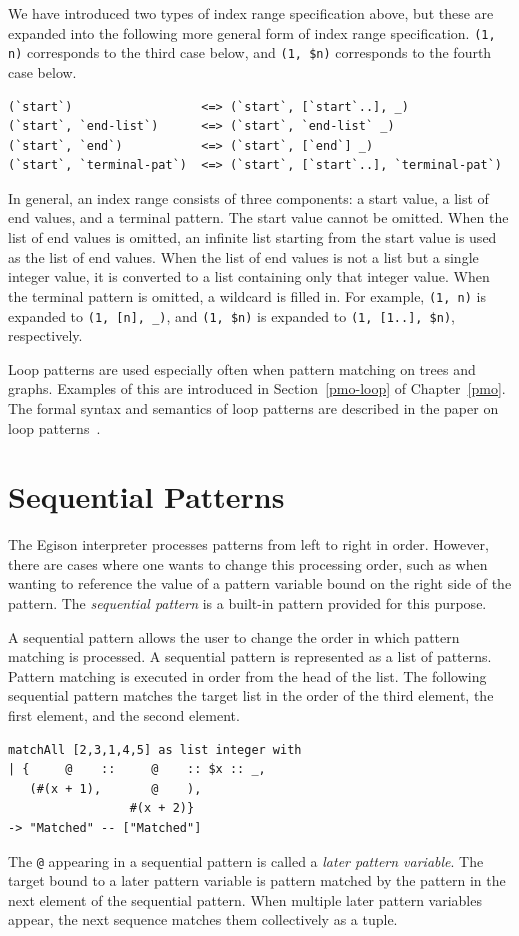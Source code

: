 We have introduced two types of index range specification above, but these are expanded into the following more general form of index range specification.
\lstinline{(1, n)} corresponds to the third case below, and \lstinline{(1, $n)} corresponds to the fourth case below.
\begin{lstlisting}[language=egison,numbers=none]
(`start`)                  <=> (`start`, [`start`..], _)
(`start`, `end-list`)      <=> (`start`, `end-list` _)
(`start`, `end`)           <=> (`start`, [`end`] _)
(`start`, `terminal-pat`)  <=> (`start`, [`start`..], `terminal-pat`)
\end{lstlisting}
In general, an index range consists of three components: a start value, a list of end values, and a terminal pattern.
The start value cannot be omitted.
When the list of end values is omitted, an infinite list starting from the start value is used as the list of end values.
When the list of end values is not a list but a single integer value, it is converted to a list containing only that integer value.
When the terminal pattern is omitted, a wildcard is filled in.
For example, \lstinline{(1, n)} is expanded to \lstinline{(1, [n], _)}, and \lstinline{(1, $n)} is expanded to \lstinline{(1, [1..], $n)}, respectively.

Loop patterns are used especially often when pattern matching on trees and graphs.
Examples of this are introduced in Section~\ref{pmo-loop} of Chapter~\ref{pmo}.
The formal syntax and semantics of loop patterns are described in the paper on loop patterns~\cite{egi2018loop}.

\section{Sequential Patterns}\label{quick-seq-pat}

The Egison interpreter processes patterns from left to right in order.
However, there are cases where one wants to change this processing order, such as when wanting to reference the value of a pattern variable bound on the right side of the pattern.
The \emph{sequential pattern} is a built-in pattern provided for this purpose.

A sequential pattern allows the user to change the order in which pattern matching is processed.
A sequential pattern is represented as a list of patterns.
Pattern matching is executed in order from the head of the list.
The following sequential pattern matches the target list in the order of the third element, the first element, and the second element.
\begin{lstlisting}[language=egison,numbers=none]
matchAll [2,3,1,4,5] as list integer with
| {     @    ::     @    :: $x :: _,
   (#(x + 1),       @    ),
                 #(x + 2)}
-> "Matched" -- ["Matched"]
\end{lstlisting}
The \lstinline|@| appearing in a sequential pattern is called a \emph{later pattern variable}.
The target bound to a later pattern variable is pattern matched by the pattern in the next element of the sequential pattern.
When multiple later pattern variables appear, the next sequence matches them collectively as a tuple.

